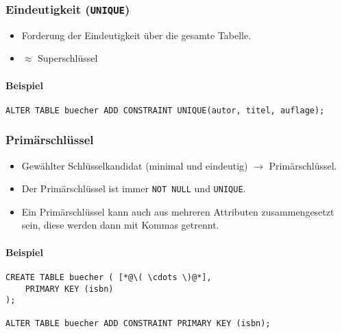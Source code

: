 \documentclass[a4paper, 11pt, accentcolor = tud3b]{tudreport}
\begin{document}
                \subsubsection{Eindeutigkeit (\lstinline|UNIQUE|)} %
                    \begin{itemize}
                    	\item Forderung der Eindeutigkeit über die gesamte Tabelle.
                    	\item[] \( \approx \) Superschlüssel
                    \end{itemize}
                
                	\paragraph{Beispiel}
                		\begin{lstlisting}
ALTER TABLE buecher ADD CONSTRAINT UNIQUE(autor, titel, auflage);
                		\end{lstlisting}

                \subsubsection{Primärschlüssel} %
                    \begin{itemize}
                    	\item Gewählter Schlüsselkandidat (minimal und eindeutig) \(\rightarrow\) Primärschlüssel.
                    	\item Der Primärschlüssel ist immer \lstinline|NOT NULL| und \lstinline|UNIQUE|.
                    	\item Ein Primärschlüssel kann auch aus mehreren Attributen zusammengesetzt sein, diese werden dann mit Kommas getrennt.
                    \end{itemize}
                
                	\paragraph{Beispiel}
                		\begin{lstlisting}
CREATE TABLE buecher ( [*@\( \cdots \)@*],
	PRIMARY KEY (isbn)
);

ALTER TABLE buecher ADD CONSTRAINT PRIMARY KEY (isbn);
                		\end{lstlisting}
\end{document}
